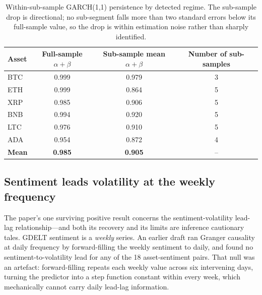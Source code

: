 \documentclass[pdflatex,sn-mathphys-num]{sn-jnl}
\theoremstyle{thmstyleone}
\theoremstyle{thmstyletwo}
\theoremstyle{thmstylethree}
\begin{document}
\begin{table}[htbp]
\centering
\caption{Within-sub-sample GARCH(1,1) persistence by detected regime. The sub-sample drop is directional; no sub-segment falls more than two standard errors below its full-sample value, so the drop is within estimation noise rather than sharply identified.}\label{tab:bai_perron_persistence}
\small
\begin{tabular}{@{}lccc@{}}
\toprule
\textbf{Asset} & \textbf{Full-sample $\alpha+\beta$} & \textbf{Sub-sample mean $\alpha+\beta$} & \textbf{Number of sub-samples} \\
\midrule
BTC & 0.999 & 0.979 & 3 \\
ETH & 0.999 & 0.864 & 5 \\
XRP & 0.985 & 0.906 & 5 \\
BNB & 0.994 & 0.920 & 5 \\
LTC & 0.976 & 0.910 & 5 \\
ADA & 0.954 & 0.872 & 4 \\
\midrule
\textbf{Mean} & \textbf{0.985} & \textbf{0.905} & -- \\
\bottomrule
\end{tabular}
\end{table}

\subsection{Sentiment leads volatility at the weekly frequency}\label{sec:granger}

The paper's one surviving positive result concerns the sentiment-volatility lead-lag relationship---and both its recovery and its limits are inference cautionary tales. GDELT sentiment is a \emph{weekly} series. An earlier draft ran Granger causality \citep{Granger1969} at daily frequency by forward-filling the weekly sentiment to daily, and found no sentiment-to-volatility lead for any of the 18 asset-sentiment pairs. That null was an artefact: forward-filling repeats each weekly value across six intervening days, turning the predictor into a step function constant within every week, which mechanically cannot carry daily lead-lag information.
\end{document}
